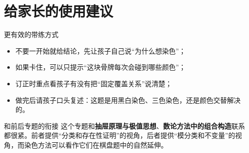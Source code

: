 \documentclass[11pt,a4paper,fontset=fandol]{ctexart}
\begin{document}
\section{给家长的使用建议}

\begin{warnbox}{更有效的带练方式}
\begin{itemize}
  \item 不要一开始就给结论，先让孩子自己说“为什么想染色”；
  \item 如果卡住，可以只提示“这块骨牌每次会碰到哪些颜色”；
  \item 订正时重点看孩子有没有把“固定覆盖关系”说清楚；
  \item 做完后请孩子口头复述：这题是用黑白染色、三色染色，还是颜色交替解决的。
\end{itemize}
\end{warnbox}

\begin{infobox}{和前后专题的衔接}
这个专题和\textbf{抽屉原理与极值思想}、\textbf{数论方法中的组合构造}联系都很紧。前者提供“分类和存在性证明”的视角，后者提供“模分类和不变量”的视角，而染色方法可以看作它们在棋盘题中的自然延伸。
\end{infobox}
\end{document}
